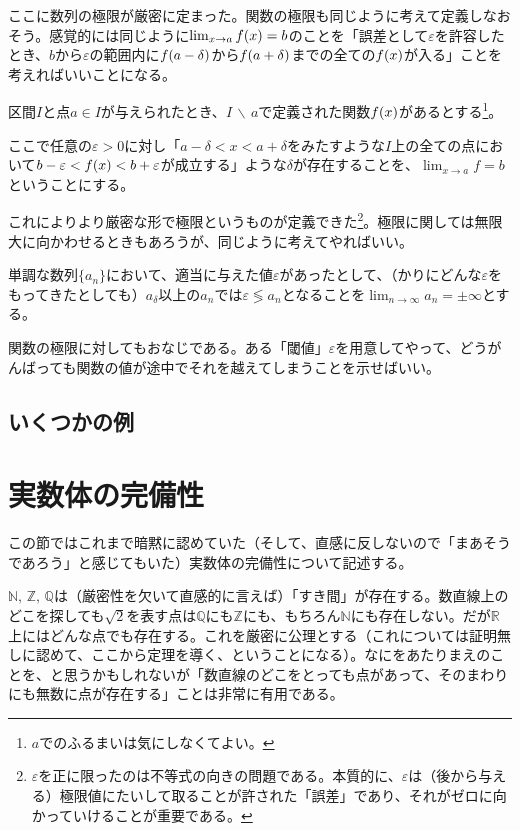 ここに数列の極限が厳密に定まった。関数の極限も同じように考えて定義しなおそう。感覚的には同じように$\lim_{x\to{}a}f\pare{x}=b$のことを「誤差として$\varepsilon$を許容したとき、$b$から$\varepsilon$の範囲内に$f\pare{a-\delta}$から$f\pare{a+\delta}$までの全ての$f\pare{x}$が入る」ことを考えればいいことになる。

\begin{defi}
    区間$I$と点$a\!\in\!I$が与えられたとき、$I\,\backslash\,a$で定義された関数$f\pare{x}$があるとする\footnote{$a$でのふるまいは気にしなくてよい。}。

    ここで任意の$\varepsilon\!>\!0$に対し「$a-\delta<x<a+\delta$をみたすような$I$上の全ての点において$b-\varepsilon<f\pare{x}<b+\varepsilon$が成立する」ような$\delta$が存在することを、$\lim_{x\to{}a}f=b$ということにする。
\end{defi}

これによりより厳密な形で極限というものが定義できた\footnote{$\varepsilon$を正に限ったのは不等式の向きの問題である。本質的に、$\varepsilon$は（後から与える）極限値にたいして取ることが許された「誤差」であり、それがゼロに向かっていけることが重要である。}。極限に関しては無限大に向かわせるときもあろうが、同じように考えてやればいい。

\begin{coro}
    単調な数列$\{a_n\}$において、適当に与えた値$\varepsilon$があったとして、（かりにどんな$\varepsilon$をもってきたとしても）$a_\delta$以上の$a_n$では$\varepsilon\lessgtr{}a_n$となることを$\lim_{n\to\infty}a_n=\pm\infty$とする。
\end{coro}

関数の極限に対してもおなじである。ある「閾値」$\varepsilon$を用意してやって、どうがんばっても関数の値が途中でそれを越えてしまうことを示せばいい。

\subsection*{いくつかの例}



\clearpage
\section{実数体の完備性}
この節ではこれまで暗黙に認めていた（そして、直感に反しないので「まあそうであろう」と感じてもいた）実数体の完備性について記述する。

$\mathbb{N},\,\mathbb{Z},\,\mathbb{Q}$は（厳密性を欠いて直感的に言えば）「すき間」が存在する。数直線上のどこを探しても$\sqrt{2}$を表す点は$\mathbb{Q}$にも$\mathbb{Z}$にも、もちろん$\mathbb{N}$にも存在しない。だが$\mathbb{R}$上にはどんな点でも存在する。これを厳密に公理とする（これについては証明無しに認めて、ここから定理を導く、ということになる）。なにをあたりまえのことを、と思うかもしれないが「数直線のどこをとっても点があって、そのまわりにも無数に点が存在する」ことは非常に有用である。

